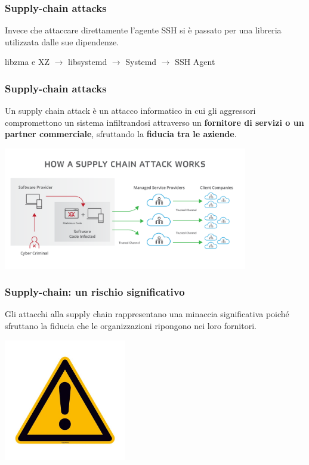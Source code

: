 \begin{frame}
\frametitle{Supply-chain attacks}
Invece che attaccare direttamente l'agente SSH si è passato per una libreria utilizzata dalle sue dipendenze.

\vspace{1 cm}
\centering
    libzma e XZ $\rightarrow$ libsystemd $\rightarrow$ Systemd $\rightarrow$ SSH Agent

\end{frame}

\begin{frame}
\frametitle{Supply-chain attacks}

Un supply chain attack è un attacco informatico in cui gli aggressori 
compromettono un sistema infiltrandosi attraverso un \textbf{fornitore di servizi o 
un partner commerciale}, sfruttando la \textbf{fiducia tra le aziende}.

\includegraphics[width=0.8\textwidth]{img/2-Introduction/supplychain.png}
\end{frame}


\begin{frame}
\frametitle{Supply-chain: un rischio significativo}

Gli attacchi alla supply chain rappresentano una minaccia significativa poiché sfruttano la fiducia che le organizzazioni ripongono nei loro fornitori.
\begin{center}
  \includegraphics[width=0.4\textwidth]{img/2-Introduction/Warning.jpg}  
\end{center}
    
\end{frame}

